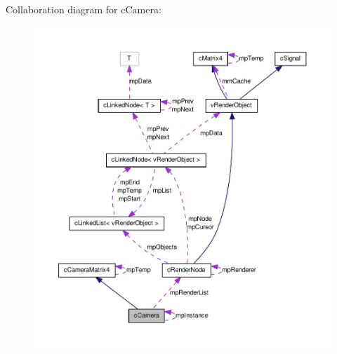 Collaboration diagram for cCamera:
\nopagebreak
\begin{figure}[H]
\begin{center}
\leavevmode
\includegraphics[width=400pt]{classc_camera__coll__graph}
\end{center}
\end{figure}
